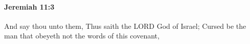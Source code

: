 
		\paragraph{Jeremiah 11:3} %
			\label{JEREMIAH-11-3}

			And say thou unto them, Thus saith the LORD God of Israel; Cursed be the man that obeyeth not the words of this covenant,


